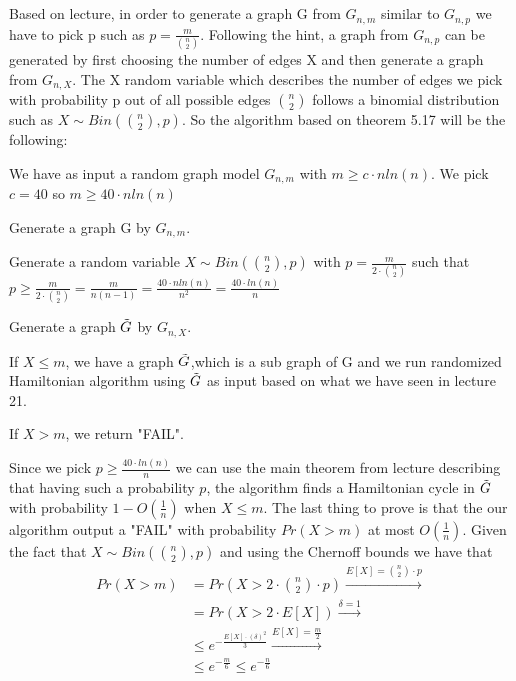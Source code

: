 \documentclass[11pt]{537homework}
\begin{document}
\subsection{} 
Based on lecture, in order to generate a graph G from $G_{n,m}$ similar to $G_{n,p}$ we have to pick p such as $p = \frac{m}{{n \choose 2}}$. Following the hint, a graph from $G_{n,p}$ can be generated by first choosing the number of edges X and then generate a graph from $G_{n,X}$. The X random variable which describes the number of edges we pick with probability p out of all possible edges ${n \choose 2}$ follows a binomial distribution such as $X \sim Bin({n \choose 2},p)$. So the algorithm based on theorem 5.17 will be the following:
\par We have as input a random graph model $G_{n,m}$ with $m \geq c \cdot nln(n)$. We pick $c = 40$ so $m \geq 40 \cdot  nln(n)$
\begin{description}[font=$\bullet$~\normalfont]
\item Generate a graph G by $G_{n,m}$.
\item Generate a random variable $X \sim Bin({n \choose 2},p)$  with $p = \frac{m}{2 \cdot {n \choose 2}}$ such that $p \geq \frac{m}{2 \cdot {n \choose 2}} = \frac{m}{n(n-1)} = \frac{40 \cdot nln(n)}{n^2} = \frac{40 \cdot ln(n)}{n}$
\item Generate a graph $\Tilde{G}$ by $G_{n,X}$.
\item If $X \leq m$, we have a graph $\Tilde{G}$,which is a sub graph of G and we run  randomized Hamiltonian algorithm using $\Tilde{G}$ as input based on what we have seen in lecture 21.
\item If $X > m$, we return "FAIL".
\end{description}
Since we pick $p \geq \frac{40 \cdot ln(n)}{n}$ we can use the main theorem from lecture describing that having such a probability $p$, the algorithm finds a Hamiltonian cycle in $\Tilde{G}$ with probability $1- O(\frac{1}{n})$ when $X \leq m$. The last thing to prove is that the our algorithm output a "FAIL" with probability $Pr(X>m)$ at most $O(\frac{1}{n})$. Given the fact that $X \sim Bin({n \choose 2},p)$ and using the Chernoff bounds we have that
\begin{align*}
    Pr(X > m) &= Pr(X> 2 \cdot {n \choose 2} \cdot p) \xrightarrow{E[X]={n \choose 2} \cdot p } \\
              &= Pr(X> 2 \cdot E[X]) \xrightarrow{\delta = 1} \\
              &\leq e^{- \frac{E[X] \cdot (\delta)^2 }{3}} \xrightarrow{E[X] = \frac{m}{2}} \\ &\leq e^{- \frac{m}{6}} \leq e^{-\frac{n}{6}} 
\end{align*}
\end{document}
